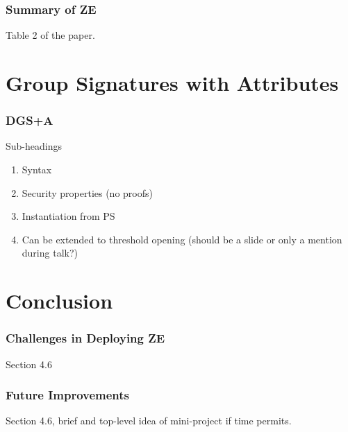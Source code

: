 \documentclass{beamer}
\begin{document}
    \begin{frame}
        \frametitle{Summary of ZE}
        Table 2 of the paper.
    \end{frame}

    \section{Group Signatures with Attributes}
    \begin{frame}
        \frametitle{DGS+A}
        Sub-headings
        \begin{enumerate}
            \item Syntax
            \item Security properties (no proofs)
            \item Instantiation from PS
            \item Can be extended to threshold opening (should be a slide or
            only a mention during talk?)
        \end{enumerate}
    \end{frame}

    \section{Conclusion}
    \begin{frame}
        \frametitle{Challenges in Deploying ZE}
        Section 4.6
    \end{frame}

    \begin{frame}
        \frametitle{Future Improvements}
        Section 4.6, brief and top-level idea of mini-project if time permits.
    \end{frame}

\end{document}

